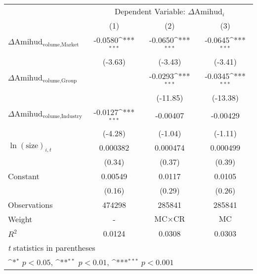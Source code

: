 {
\def\sym#1{\ifmmode^{#1}\else\(^{#1}\)\fi}
\begin{tabular}{l*{3}{c}}
\hline\hline
                    &\multicolumn{3}{c}{Dependent Variable: $\Delta \text{Amihud}_{i} $ }\\\cmidrule(lr){2-4}
                    &\multicolumn{1}{c}{(1)}         &\multicolumn{1}{c}{(2)}         &\multicolumn{1}{c}{(3)}         \\
\hline
 $ \Delta \text{Amihud}_{\text{volume},\text{Market}} $&     -0.0580\sym{***}&     -0.0650\sym{***}&     -0.0645\sym{***}\\
                    &     (-3.63)         &     (-3.43)         &     (-3.41)         \\
[1em]
 $ \Delta \text{Amihud}_{\text{volume},\text{Group}} $ &                     &     -0.0293\sym{***}&     -0.0345\sym{***}\\
                    &                     &    (-11.85)         &    (-13.38)         \\
[1em]
 $ \Delta \text{Amihud}_{\text{volume},\text{Industry}} $ &     -0.0127\sym{***}&    -0.00407         &    -0.00429         \\
                    &     (-4.28)         &     (-1.04)         &     (-1.11)         \\
[1em]
 $ \ln(\text{size})_{i,t} $ &    0.000382         &    0.000474         &    0.000499         \\
                    &      (0.34)         &      (0.37)         &      (0.39)         \\
[1em]
Constant            &     0.00549         &      0.0117         &      0.0105         \\
                    &      (0.16)         &      (0.29)         &      (0.26)         \\
\hline
Observations        &      474298         &      285841         &      285841         \\
Weight              &           -         & $ \text{MC} \times \text{CR} $          & $ \text{MC} $          \\
$ R^2 $             &      0.0124         &      0.0308         &      0.0303         \\
\hline\hline
\multicolumn{4}{l}{\footnotesize \textit{t} statistics in parentheses}\\
\multicolumn{4}{l}{\footnotesize \sym{*} \(p<0.05\), \sym{**} \(p<0.01\), \sym{***} \(p<0.001\)}\\
\end{tabular}
}
